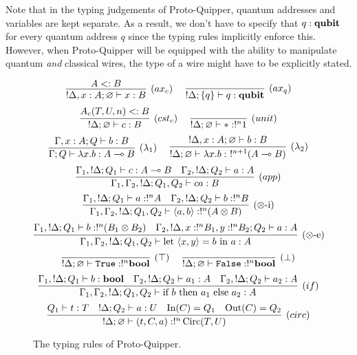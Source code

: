 \documentclass[twoside]{article}
\begin{document}
Note that in the typing judgements of Proto-Quipper, quantum addresses 
and variables are kept separate. As a result, we don't have to specify 
that $q:\textrm{\bf qubit}$ for every quantum address $q$ since the typing rules 
implicitly enforce this. However, when Proto-Quipper will be equipped 
with the ability to manipulate quantum \emph{and} classical wires, the 
type of a wire might have to be explicitly stated.


\begin{figure}[!ht]
\begin{mdframed}
\[
\infer[(ax_c)]{!\Delta, x:A;\varnothing\entails x:B}{
  A<:B
}
~~~~
\infer[(ax_q)]{!\Delta;\s{q}\entails q:\qubit}{
} 
\]
\[
\infer[(cst_c)]{!\Delta;\varnothing \entails c:B}{
  A_{c}(T,U,n)<:B
} 
~~~~
\infer[(unit)]{!\Delta;\varnothing\entails *:!^n 1}{
}
\]
\[
\infer[(\lambda_1)]{\Gamma;Q\entails \lambda x.b:A\loli B}{
  \Gamma,x:A;Q \entails b:B
}
~~~~
\infer[(\lambda_2)]{!\Delta;\varnothing \entails \lambda x.b:~!^{n+1}(A\loli B)}{
  !\Delta, x:A;\varnothing \entails b:B
}
\]
\[
\infer[(app)]{\Gamma_1,\Gamma_2, !\Delta;Q_1,Q_2\entails ca:B}{
  \Gamma_1, !\Delta;Q_1\entails c:A\loli B 
  &
  \Gamma_2, !\Delta ;Q_2\entails a:A 
}
\]
\[
\infer[(\x\mbox{-i})]{\Gamma_1,\Gamma_2, !\Delta;Q_1,Q_2\entails \p{a,b}:!^n(A\x B)}{
  \Gamma_1, !\Delta;Q_1\entails a:!^nA 
  &
  \Gamma_2, !\Delta ;Q_2\entails b:!^nB
}
\]
\[
\infer[(\x\mbox{-e})]{\Gamma_1,\Gamma_2, !\Delta;Q_1,Q_2\entails \letin{\p{x,y}}{b}{a}:A}{
  \Gamma_1, !\Delta;Q_1\entails b:!^n(B_1\x B_2) 
  &
  \Gamma_2, !\Delta, x:!^nB_1, y:!^nB_2 ;Q_2\entails a:A
}
\]
\[
\infer[(\top)]{!\Delta;\varnothing\entails \true:!^n \bool}{
} 
~~~~
\infer[(\bot)]{!\Delta;\varnothing\entails \false:!^n \bool}{
}
\]
\[
\infer[(if)]{\Gamma_1,\Gamma_2, !\Delta;Q_1,Q_2\entails \ifthenelse{b}{a_1}{a_2}:A}{
  \Gamma_1, !\Delta;Q_1\entails b:\bool 
  &
  \Gamma_2, !\Delta;Q_2 \entails a_1:A ~~~ \Gamma_2, !\Delta;Q_2 \entails a_2:A
}
\]
\[
\infer[(circ)]{!\Delta;\varnothing \entails (t,C,a):!^n\Circ(T,U)}{
  Q_1\entails t:T 
  &
  !\Delta ; Q_2\entails a:U 
  &
  \In(C)=Q_1 
  &
  \Out(C)=Q_2
}
\]
\end{mdframed}
\caption{The typing rules of Proto-Quipper.}
\label{trules}
\end{figure}
\end{document}
